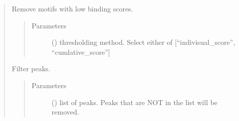 \documentclass[letterpaper,10pt,english]{sphinxmanual}
\begin{document}
\begin{quote}
\begin{fulllineitems}
\begin{fulllineitems}
\end{fulllineitems}


\begin{fulllineitems}
\label{\detokenize{modules/celloracle.motif_analysis:celloracle.motif_analysis.TFinfo.filter_motifs_by_score}}
Remove motifs with low binding scores.
\begin{quote}\begin{description}
\item[{Parameters}] \leavevmode
{} () \textendash{} thresholding method. Select either of {[}“indivisual\_score”, “cumlative\_score”{]}

\end{description}\end{quote}

\end{fulllineitems}


\begin{fulllineitems}
\label{\detokenize{modules/celloracle.motif_analysis:celloracle.motif_analysis.TFinfo.filter_peaks}}
Filter peaks.
\begin{quote}\begin{description}
\item[{Parameters}] \leavevmode
{} () \textendash{} list of peaks. Peaks that are NOT in the list will be removed.

\end{description}\end{quote}

\end{fulllineitems}



\end{fulllineitems}
\end{quote}
\end{document}
